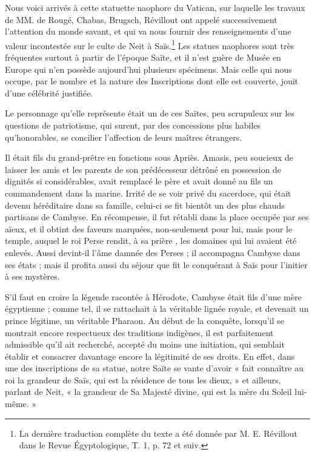 \documentclass[a4paper, 11pt, oneside]{article}
\begin{document}
Nous voici arrivés à cette statuette naophore du Vatican, sur laquelle les travaux de MM. de Rougé, Chabas, Brugsch, Révillout ont appelé successivement l'attention du monde savant, et qui va nous fournir des renseignements d'une valeur incontestée sur le culte de Neit à Saïs.\footnote{La dernière traduction complète du texte a été donnée par M. E. Révillout dans le Revue Égyptologique, T. 1, p. 72 et suiv.} Les statues naophores sont très fréquentes surtout à partir de l'époque Saïte, et il n'est guère de Musée en Europe qui n'en possède aujourd'hui plusieurs spécimens. Mais celle qui nous occupe, par le nombre et la nature des Inscriptions dont elle est couverte, jouit d'une célébrité justifiée.

Le personnage qu'elle représente était un de ces Saïtes, peu scrupuleux sur les questions de patriotisme, qui surent, par des concessions plus habiles qu'honorables, se concilier l'affection de leurs maîtres étrangers.

Il était fils du grand-prêtre en fonctions sous Apriès. Amasis, peu soucieux de laisser les amis et les parents de son prédécesseur détrôné en possession de dignités si considérables, avait remplacé le père et avait donné au fils un commandement dans la marine. Irrité de se voir privé du sacerdoce, qui était devenu héréditaire dans sa famille, celui-ci se fit bientôt un des plus chauds partisans de Cambyse. En récompense, il fut rétabli dans la place occupée par ses aïeux, et il obtint des faveurs marquées, non-seulement pour lui, mais pour le temple, auquel le roi Perse rendit, à sa prière , les domaines qui lui avaient été enlevés. Aussi devint-il l'âme damnée des Perses ; il accompagna Cambyse dans ses états ; mais il profita aussi du séjour que fit le conquérant à Saïs pour l'initier à ses mystères.

S'il faut en croire la légende racontée à Hérodote, Cambyse était fils d'une mère égyptienne ; comme tel, il se rattachait à la véritable lignée royale, et devenait un prince légitime, un véritable Pharaon. Au début de la conquête, lorsqu'il se montrait encore respectueux des traditions indigènes, il est parfaitement admissible qu'il ait recherché, accepté du moins une initiation, qui semblait établir et consacrer davantage encore la légitimité de ses droits. En effet, dans une des inscriptions de sa statue, notre Saïte se vante d'avoir « fait connaître au roi la grandeur de Saïs, qui est la résidence de tous les dieux, » et ailleurs, parlant de Neit, « la grandeur de Sa Majesté divine, qui est la mère du Soleil lui-même. »
\end{document}
